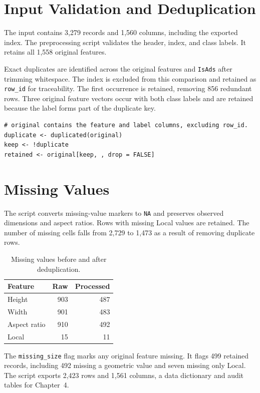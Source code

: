 \section{Input Validation and Deduplication}

The input contains 3,279 records and 1,560 columns, including the
exported index. The preprocessing script validates the header, index,
and class labels. It retains all 1,558 original features.

Exact duplicates are identified across the original features and
\texttt{IsAds} after trimming whitespace. The index is excluded from
this comparison and retained as \texttt{row\_id} for traceability.
The first occurrence is retained, removing 856 redundant rows.
Three original feature vectors occur with both class labels and are
retained because the label forms part of the duplicate key.

\begin{lstlisting}[style=edaR,aboveskip=4pt,belowskip=4pt]
# original contains the feature and label columns, excluding row_id.
duplicate <- duplicated(original)
keep <- !duplicate
retained <- original[keep, , drop = FALSE]
\end{lstlisting}

\section{Missing Values}

The script converts missing-value markers to \texttt{NA} and preserves
observed dimensions and aspect ratios. Rows with missing Local values
are retained. The number of missing cells falls from 2,729 to 1,473
as a result of removing duplicate rows.

\begin{table}[htbp]
\centering
\caption{Missing values before and after deduplication.}
\label{tab:preprocessing-missing}
\begin{tabular}{lrr}
\toprule
Feature & Raw & Processed\\
\midrule
Height & 903 & 487\\
Width & 901 & 483\\
Aspect ratio & 910 & 492\\
Local & 15 & 11\\
\bottomrule
\end{tabular}
\end{table}

The \texttt{missing\_size} flag marks any original feature missing.
It flags 499 retained records, including 492 missing a geometric value
and seven missing only Local. The script exports 2,423 rows and 1,561
columns, a data dictionary and audit tables for Chapter~4.

